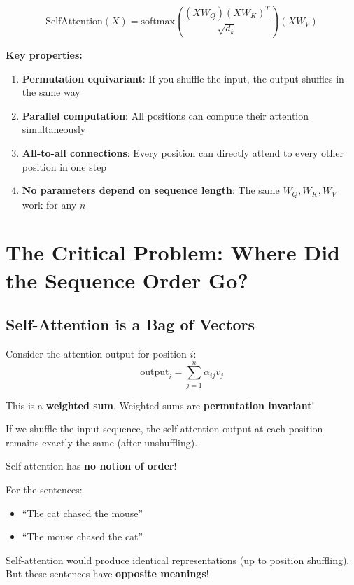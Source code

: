 \documentclass{article}
\begin{document}
\[
\text{SelfAttention}(X) = \text{softmax}\left(\frac{(XW_Q)(XW_K)^T}{\sqrt{d_k}}\right)(XW_V)
\]

\textbf{Key properties:}
\begin{enumerate}
\item \textbf{Permutation equivariant}: If you shuffle the input, the output shuffles in the same way
\item \textbf{Parallel computation}: All positions can compute their attention simultaneously
\item \textbf{All-to-all connections}: Every position can directly attend to every other position in one step
\item \textbf{No parameters depend on sequence length}: The same $W_Q, W_K, W_V$ work for any $n$
\end{enumerate}

\section{The Critical Problem: Where Did the Sequence Order Go?}

\subsection{Self-Attention is a Bag of Vectors}

Consider the attention output for position $i$:
\[
\text{output}_i = \sum_{j=1}^{n} \alpha_{ij} v_j
\]

This is a \textbf{weighted sum}. Weighted sums are \textbf{permutation invariant}!

\begin{tcolorbox}[colback=red!5!white, colframe=red!75!black, title=The Bag of Vectors Problem]
If we shuffle the input sequence, the self-attention output at each position remains exactly the same (after unshuffling).

Self-attention has \textbf{no notion of order}!

For the sentences:
\begin{itemize}
\item ``The cat chased the mouse''
\item ``The mouse chased the cat''
\end{itemize}

Self-attention would produce identical representations (up to position shuffling). But these sentences have \textbf{opposite meanings}!
\end{tcolorbox}
\end{document}
